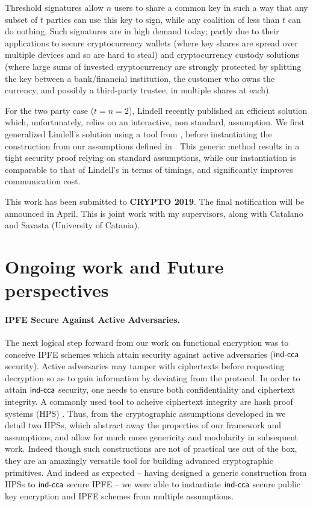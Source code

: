 \documentclass[10pt]{llncs}
\begin{document}
Threshold signatures allow $n$ users to share a common key in such a way that any subset of $t$ parties can use this key to sign, while any coalition of less than $t$ can do nothing. 
%
Such signatures are in high demand today; partly due to their applications to secure cryptocurrency wallets (where key shares are spread over multiple devices and so are hard to steal) and cryptocurrency custody solutions (where large sums of invested cryptocurrency are strongly protected by splitting the key between a bank/financial institution, the customer who owns the currency, and possibly a third-party trustee, in multiple shares at each).

For the two party case ($t=n=2$), Lindell \cite{C:Lindell17} recently published an efficient solution which, unfortunately, relies on an interactive, non standard, assumption. We first generalized Lindell’s solution using a tool from \cite{EC:CraSho02}, before instantiating the construction from our assumptions defined in \cite{AC:CasLagTuc18}. This generic method results in a tight security proof relying on standard assumptions, while
%
our instantiation is comparable to that of Lindell's in terms of timings, and significantly improves communication cost.

This work has been submitted to \textbf{CRYPTO 2019}. The final notification will be announced in April. This is joint work with my supervisors, along with Catalano and Savasta (University of Catania).



\section{Ongoing work and Future perspectives}
\paragraph{IPFE Secure Against Active Adversaries.}
The next logical step forward from our work on functional encryption was to conceive IPFE schemes which attain security against active adversaries ($\mathsf{ind\mbox{-}cca}$ security). Active adversaries may tamper with ciphertexts before requesting decryption so as to gain information by deviating from the protocol. In order to attain $\mathsf{ind\mbox{-}cca}$ security, one needs to ensure both confidentiality and ciphertext integrity.
%
A commonly used tool to acheive ciphertext integrity are hash proof systems (HPS) \cite{EC:CraSho02}.
Thus, from the cryptographic assumptions developed in \cite{AC:CasLagTuc18} we detail two HPSs, which abstract away the properties of our framework and assumptions, and allow for much more genericity and modularity in subsequent work.
%
Indeed though such constructions are not of practical use out of the box, they are an amazingly versatile tool for building advanced cryptographic primitives. And indeed as expected -- having designed a generic construction from HPSs to $\mathsf{ind\mbox{-}cca}$ secure IPFE -- we were able to instantiate $\mathsf{ind\mbox{-}cca}$ secure public key encryption and IPFE schemes from multiple assumptions. 
\end{document}
